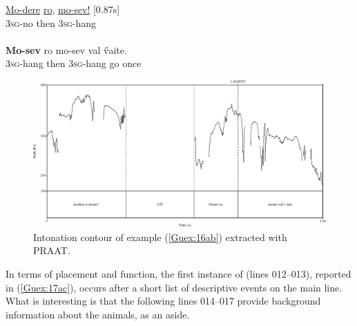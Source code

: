 \documentclass[output=paper]{LSP/langsci}
\begin{document}
\begin{exe}
\ex \label{Guex:16ab}
\begin{xlist}
\ex \label{Guex:16a}
\gll \underline{Mo-dere}          \underline{ro},                 \underline{mo-sev!}     [0.87s]\\
\textsc{3sg}-no     then  \textsc{3sg}-hang \\
\glt {}\\
\ex \label{Guex:16b}
\gll  \textbf{Mo-sev}       ro mo-sev         val   \H{v}aite.\\     	       
 \textsc{3sg}-hang   then   \textsc{3sg}-hang     go    once\\
\glt {} 
\end{xlist}
\end{exe}

\begin{figure}[ht]
\includegraphics[width=\textwidth]{figures/guerinFig6x.eps}
\caption{Intonation contour of example (\ref{Guex:16ab}) extracted with PRAAT. \label{GuF6}}
\end{figure}


In terms of placement and function, the first instance of  (lines 012--013), reported in (\ref{Guex:17ac}), occurs after a short list of descriptive events on the main line. What is interesting is that the following lines 014--017 provide background information about the animals, as an aside. 
\end{document}
